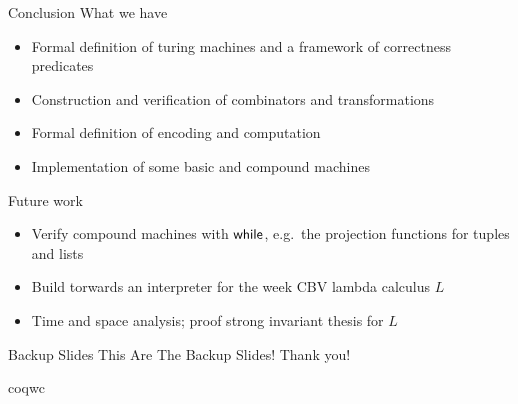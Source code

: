 \begin{frame}{Conclusion}
  What we have
  \begin{itemize}
    \item Formal definition of turing machines and a framework of correctness predicates
    \item Construction and verification of combinators and transformations
    \item Formal definition of encoding and computation
    \item Implementation of some basic and compound machines
  \end{itemize}

  Future work
  \begin{itemize}
    \item Verify compound machines with $\textsf{while}$, e.g.\ the projection functions for tuples and lists
    \item Build torwards an interpreter for the week CBV lambda calculus $L$
    \item Time and space analysis; proof strong invariant thesis for $L$
  \end{itemize}
\end{frame}

\appendix %

\backupbegin %

\begin{frame}{Backup Slides}
  This Are The Backup Slides!
  \vfill
  Thank you!
\end{frame}

\begin{frame}{coqwc}
  \tiny
  
\end{frame}

\backupend


